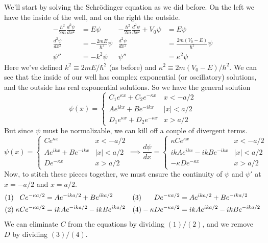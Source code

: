 \documentclass[../p052main.tex]{subfiles}
\begin{document}
We'll start by solving the Schrödinger equation as we did before.
On the left we have the inside of the well, and on the right the outside.
\begin{align*}
    -\frac{\hbar^2}{2m} \frac{d^2 \psi}{d x^2} &= E \psi & -\frac{\hbar^2}{2m} \frac{d^2 \psi}{d x^2} + V_0 \psi &= E \psi \\
    \frac{d^2 \psi}{dx^2} &= -\frac{2mE}{\hbar^2}\psi & \frac{d^2 \psi}{dx^2} &= \frac{2m(V_0 - E)}{\hbar^2} \psi \\
    \psi'' &= -k^2 \psi & \psi'' &= \kappa^2 \psi
\end{align*}
Here we've defined $k^2 \equiv 2mE/\hbar^2$ (as before) and $\kappa^2 \equiv 2m (V_0 - E)/\hbar^2$.
We can see that the inside of our well has complex exponential (or oscillatory) solutions, and the outside has real exponential solutions.
So we have the general solution
\[ \psi(x) = \begin{cases} C_1 e^{\kappa x} + C_2 e^{-\kappa x} & x < -a/2 \\ Ae^{ikx} + Be^{-ikx} & |x| < a/2 \\ D_1 e^{\kappa x} + D_2 e^{-\kappa x} & x > a/2 \end{cases} \]
But since $\psi$ must be normalizable, we can kill off a couple of divergent terms.
\[ \psi(x) = \begin{cases} C e^{\kappa x} & x < -a/2 \\ Ae^{ikx} + Be^{-ikx} & |x| < a/2 \\ D e^{-\kappa x} & x > a/2 \end{cases}
\implies
\frac{d\psi}{dx} = \begin{cases} \kappa Ce^{\kappa x} & x < -a/2 \\ ikAe^{ikx} - ikBe^{-ikx} & |x| < a/2 \\ -\kappa De^{-\kappa x} & x > a/2 \end{cases} \]
Now, to stitch these pieces together, we must ensure the continuity of $\psi$ and $\psi'$ at $x = -a/2$ and $x = a/2$.
\begin{align*}
    (1) \;\phantom{\kappa} Ce^{-\kappa a/2} &= Ae^{-ika/2} + Be^{ika/2} & (3) \hspace{4.5pt}\phantom{-\kappa} De^{-\kappa a/2} &= Ae^{ika/2} + Be^{-ika/2} \\
    (2) \; \kappa Ce^{-\kappa a/2} &= ikAe^{-ika/2} - ikBe^{ika/2} & (4) -\kappa De^{-\kappa a/2} &= ikA e^{ika/2} - ikBe^{-ika/2}
\end{align*}%
We can eliminate $C$ from the equations by dividing $(1) / (2)$, and we remove $D$ by dividing $(3) / (4)$.
\end{document}
